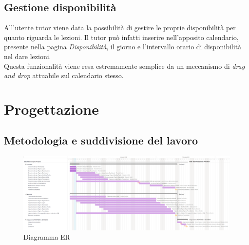 \documentclass[12pt]{article}
\begin{document}
\subsection{Gestione disponibilit\`a}
All'utente tutor viene data la possibilit\`a di gestire le proprie disponibilit\`a per quanto riguarda le lezioni. Il tutor pu\`o infatti inserire nell'apposito calendario, presente nella pagina \emph{Disponibilit\`a}, il giorno e l'intervallo orario di disponibilit\`a nel dare lezioni.\\
Questa funzionalit\`a viene resa estremamente semplice da un meccanismo di \emph{drag and drop} attuabile sul calendario stesso.

\pagebreak

\section{Progettazione}
\subsection{Metodologia e suddivisione del lavoro}
\begin{figure}[H]
	\centering
	\includegraphics[width=\textwidth]{../../interni_statici/gantt/gantt2.png}
	\caption{Diagramma ER}
	\label{fig:er}
\end{figure}
\end{document}
